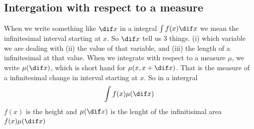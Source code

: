 \subsection{Intergation with respect to a measure} %
\label{sub:intergation_with_respect_to_a_measure}
When we write something like \(\dif x\) in a integral \(\int f(x) \dif x\) we mean the infinitesimal interval starting at \(x\). So \(\dif x\) tell us 3 things. (i) which variable we are dealing with (ii) the value of that variable, and (iii) the length of a infinitesimal at that value. When we integrate with respect to a measure \(\mu\), we write \(\mu(\dif x)\), which is short hand for \(\mu(x,x+\dif x)\). That is the measure of a infinitesimal change in interval starting at \(x\). So in a intergral
\[
  \int f(x) \mu(\dif x)
\]
\(f(x)\) is the height and \(\mu(\dif x)\) is the lenght of the infinitisimal area \(f(x) \mu(\dif x)\)

